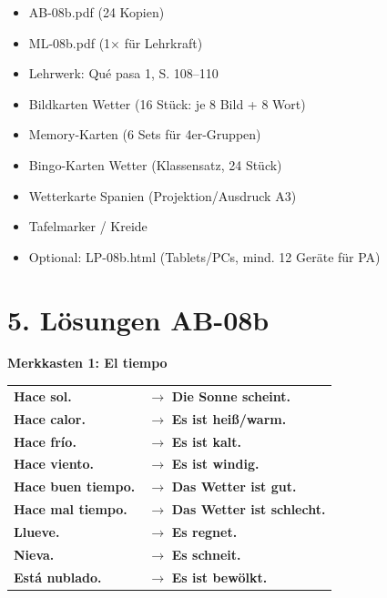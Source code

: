 \documentclass[11pt, a4paper]{article}
\newcommand{\fachfarbe}{spanisch}
\newcommand{\lerngruppengroesse}{24}
\newcommand{\loesung}[1]{\textcolor{loesung}{\textbf{#1}}}
\newcommand{\es}[1]{\textcolor{\fachfarbe}{\textbf{#1}}}
\begin{document}
\begin{materialbox}
\begin{itemize}[label=$\square$]
    \item AB-08b.pdf (\lerngruppengroesse{} Kopien)
    \item ML-08b.pdf (1× für Lehrkraft)
    \item Lehrwerk: Qué pasa 1, S. 108--110
    \item Bildkarten Wetter (16 Stück: je 8 Bild + 8 Wort)
    \item Memory-Karten (6 Sets für 4er-Gruppen)
    \item Bingo-Karten Wetter (Klassensatz, 24 Stück)
    \item Wetterkarte Spanien (Projektion/Ausdruck A3)
    \item Tafelmarker / Kreide
    \item Optional: LP-08b.html (Tablets/PCs, mind. 12 Geräte für PA)
\end{itemize}
\end{materialbox}


\section*{5. Lösungen AB-08b}

\textbf{Merkkasten 1: El tiempo}

\begin{tabular}{ll}
\es{Hace sol.} & $\rightarrow$ \loesung{Die Sonne scheint.} \\
\es{Hace calor.} & $\rightarrow$ \loesung{Es ist heiß/warm.} \\
\es{Hace frío.} & $\rightarrow$ \loesung{Es ist kalt.} \\
\es{Hace viento.} & $\rightarrow$ \loesung{Es ist windig.} \\
\es{Hace buen tiempo.} & $\rightarrow$ \loesung{Das Wetter ist gut.} \\
\es{Hace mal tiempo.} & $\rightarrow$ \loesung{Das Wetter ist schlecht.} \\
\es{Llueve.} & $\rightarrow$ \loesung{Es regnet.} \\
\es{Nieva.} & $\rightarrow$ \loesung{Es schneit.} \\
\es{Está nublado.} & $\rightarrow$ \loesung{Es ist bewölkt.} \\
\end{tabular}
\end{document}
